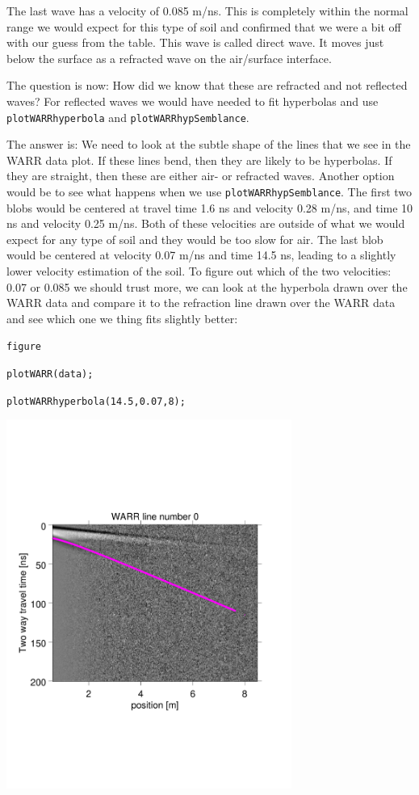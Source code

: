 \documentclass[11pt]{article}
\begin{document}
The last wave has a velocity of 0.085 m/ns. This is completely within
the normal range we would expect for this type of soil and confirmed
that we were a bit off with our guess from the table. This wave is
called direct wave. It moves just below the surface as a refracted
wave on the air/surface interface.

The question is now: How did we know that these are refracted and not
reflected waves? For reflected waves we would have needed to fit
hyperbolas and use \verb#plotWARRhyperbola# and \linebreak
\verb#plotWARRhypSemblance#.

The answer is: We need to look at the subtle shape of the lines that
we see in the WARR data plot. If these lines bend, then they are
likely to be hyperbolas. If they are straight, then these are either
air- or refracted waves. Another option would be to see what happens
when we use \verb#plotWARRhypSemblance#.  The first two blobs would be
centered at travel time 1.6 ns and velocity 0.28 m/ns, and time 10 ns
and velocity 0.25 m/ns. Both of these velocities are outside of what
we would expect for any type of soil and they would be too slow for
air. The last blob would be centered at velocity 0.07 m/ns and time
14.5 ns, leading to a slightly lower velocity estimation of the
soil. To figure out which of the two velocities: 0.07 or 0.085 we
should trust more, we can look at the hyperbola drawn over the WARR
data and compare it to the refraction line drawn over the WARR data
and see which one we thing fits slightly better:

\qquad \verb#figure#

\qquad \verb#plotWARR(data);#

\qquad \verb#plotWARRhyperbola(14.5,0.07,8);#

\begin{center}
  \includegraphics[width=0.7\textwidth,trim = 0.9cm 6cm 2cm
    6.5cm,clip]{figures/WARRhyperb}
\end{center}
\end{document}
